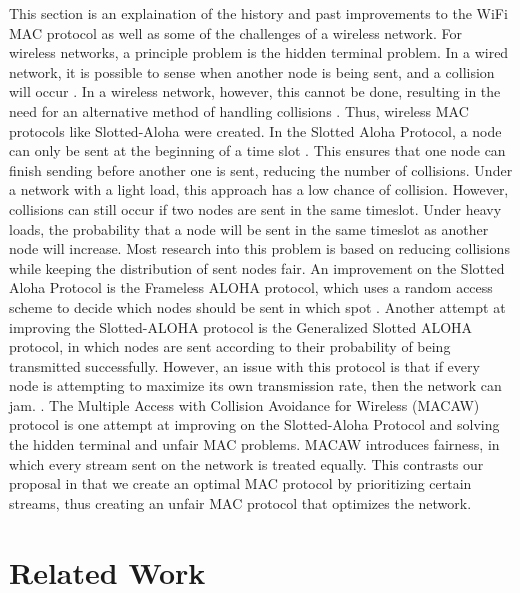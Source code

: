 \documentclass{sigcomm-alternate}
\begin{document}
This section is an explaination of the history and past improvements to the WiFi MAC protocol as well as some of the challenges of a wireless network. For wireless networks, a principle problem is the hidden terminal problem. In a wired network, it is possible to sense when another node is being sent, and a collision will occur \cite{869217}. In a wireless network, however, this cannot be done, resulting in the need for an alternative method of handling collisions \cite{6574961}. Thus, wireless MAC protocols like Slotted-Aloha were created.  In the Slotted Aloha Protocol, a node can only be sent at the beginning of a time slot \cite{5340799}. This ensures that one node can finish sending before another one is sent, reducing the number of collisions.  Under a network with a light load, this approach has a low chance of collision. However, collisions can still occur if two nodes are sent in the same timeslot. Under heavy loads, the probability that a node will be sent in the same timeslot as another node will increase. Most research into this problem is based on reducing collisions while keeping the distribution of sent nodes fair.  An improvement on the Slotted Aloha Protocol is the Frameless ALOHA protocol, which uses a random access scheme to decide which nodes should be sent in which spot \cite{6336861}. Another attempt at improving the Slotted-ALOHA protocol is the Generalized Slotted ALOHA protocol, in which nodes are sent according to their probability of being transmitted successfully. However, an issue with this protocol is that if every node is attempting to maximize its own transmission rate, then the network can jam. \cite{4548143 }.  The Multiple Access with Collision Avoidance for Wireless (MACAW) protocol is one attempt at improving on the Slotted-Aloha Protocol and solving the hidden terminal and unfair MAC problems. MACAW introduces fairness, in which every stream sent on the network is treated equally. This contrasts our proposal in that we create an optimal MAC protocol by prioritizing certain streams, thus creating an unfair MAC protocol that optimizes the network.

\section{Related Work}
\label{section:relatedwork}
\end{document}

